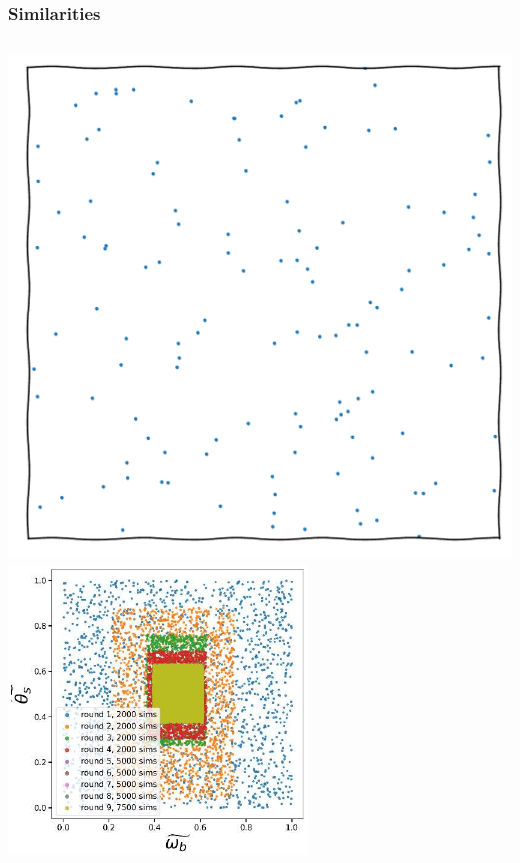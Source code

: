 \documentclass[aspectratio=169]{beamer}
\begin{document}
\begin{frame}
    \frametitle{Similarities}

    \begin{columns}
        \includegraphics[width=\textwidth,page=15]{figures/himmelblau}%
        \includegraphics[width=\textwidth]{figures/tmnre.pdf}
    \end{columns}
\end{frame}
\end{document}
